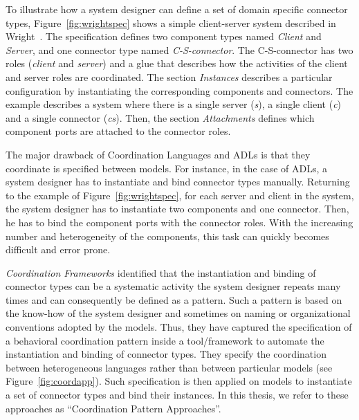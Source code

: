 To illustrate how a system designer can define a set of domain specific connector types, Figure~\ref{fig:wrightspec} shows a simple client-server system described in Wright~\cite{wrightbib}. The specification defines two component types named \emph{Client} and \emph{Server}, and one connector type named \emph{C-S-connector}. The C-S-connector has two roles (\emph{client} and \emph{server}) and a glue that describes how the activities of the client and server roles are coordinated. The section \emph{Instances} describes a particular configuration by instantiating the corresponding components and connectors. The example describes a system where there is a single server (\emph{s}), a single client (\emph{c}) and a single connector (\emph{cs}). Then, the section \emph{Attachments} defines which component ports are attached to the connector roles. 

The major drawback of Coordination Languages and ADLs is that they coordinate is specified between models. For instance, in the case of ADLs, a system designer has to instantiate and bind connector types manually. Returning to the example of Figure~\ref{fig:wrightspec}, for each server and client in the system, the system designer has to instantiate two components and one connector. Then, he has to bind the component ports with the connector roles. With the increasing number and heterogeneity of the components, this task can quickly becomes difficult and error prone.

\emph{Coordination Frameworks} identified that the instantiation and binding of connector types can be a systematic activity the system designer repeats many times and can consequently be defined as a pattern. Such a pattern is based on the know-how of the system designer and sometimes on naming or organizational conventions adopted by the models. Thus, they have captured the specification of a behavioral coordination pattern inside a tool/framework to automate the instantiation and binding of connector types. They specify the coordination between heterogeneous languages rather than between particular models (see Figure~\ref{fig:coordapp}). Such specification is then applied on models to instantiate a set of connector types and bind their instances. In this thesis, we refer to these approaches as “Coordination Pattern Approaches”.

 


